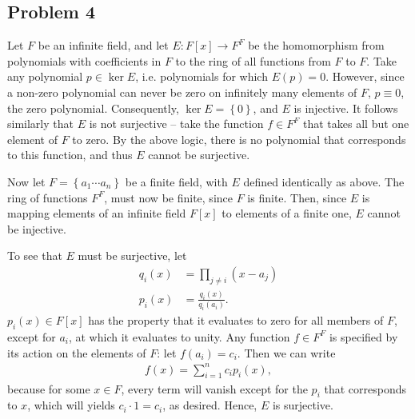 \documentclass{../../mathnotes}
\begin{document}
\subsection*{Problem 4}

Let $F$ be an infinite field, and let $E:F[x]\to F^F$ be the homomorphism from polynomials with coefficients in $F$ to the ring of all functions from
$F$ to $F$. Take any polynomial $p\in\ker E$, i.e. polynomials for which $E(p)=0$. However, since a non-zero polynomial can never be zero on
infinitely many elements of $F$, $p\equiv 0$, the zero polynomial. Consequently, $\ker E=\left\{ 0 \right\}$, and $E$ is injective. It follows
similarly that $E$ is not surjective -- take the function $f\in F^F$ that takes all but one element of $F$ to zero. By the above logic,
there is no polynomial that corresponds to this function, and thus $E$ cannot be surjective.

Now let $F=\left\{ a_1 \cdots a_n \right\}$ be a finite field, with $E$ defined identically as above.
The ring of functions $F^F$, must now be finite, since $F$ is finite. Then, since $E$ is mapping elements of
an infinite field $F[x]$ to elements of a finite one, $E$ cannot be injective.

To see that $E$ must be surjective, let
\begin{align*}
    q_i(x)&=\prod_{j\neq i}(x-a_j)\\
    p_i(x)&=\frac{q_i(x)}{q_i(a_i)}.
\end{align*}
$p_i(x)\in F[x]$ has the property that it evaluates to zero for all members of $F$, except for $a_i$, at which it evaluates to unity.
Any function $f\in F^F$ is specified by its action on the elements of $F$: let $f(a_i)=c_i$. Then we can write
\begin{align*}
    f(x)=\sum_{i=1}^n c_ip_i(x),
\end{align*}
because for some $x\in F$, every term will vanish except for the $p_i$ that corresponds to $x$, which will yields $c_i\cdot 1=c_i$,
as desired. Hence, $E$ is surjective.
\end{document}
